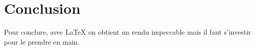 \part*{Conclusion}

Pour conclure, avec \LaTeX{} on obtient un rendu impeccable mais il faut s'investir pour le prendre en main.
